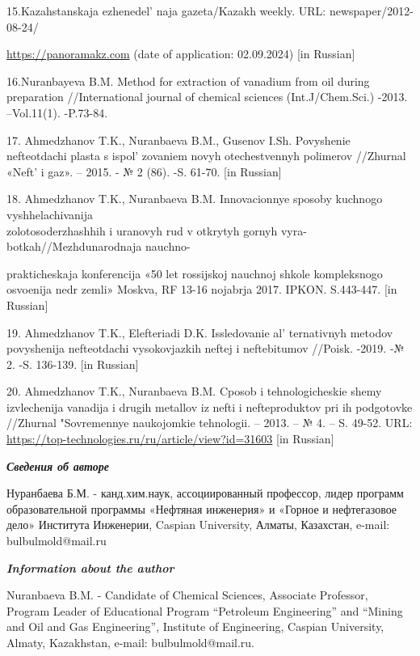 \begin{references}
15.Kazahstanskaja ezhenedel' naja gazeta/Kazakh weekly.
URL: newspaper/2012-08-24/

\href{https://panoramakz.com/index.php/economics/oil/item/32263-?utm\_source=google.com\&utm\_medium=organic\&utm\_campaign=google.com\&utm\_referrer=google.com}{https://panoramakz.com}
(date of application: 02.09.2024) {[}in Russian{]}

16.Nuranbayeva B.M. Method for extraction of vanadium from oil during
preparation //International journal of chemical sciences
(Int.J/Chem.Sci.) -2013. --Vol.11(1). -P.73-84.

17. Ahmedzhanov T.K., Nuranbaeva B.M., Gusenov I.Sh. Povyshenie
nefteotdachi plasta s ispol' zovaniem novyh
otechestvennyh polimerov //Zhurnal «Neft'{} i gaz». --
2015. - № 2 (86). -S. 61-70. {[}in Russian{]}

18. Ahmedzhanov T.K., Nuranbaeva B.M. Innovacionnye sposoby kuchnogo
vyshhelachivanija \\zolotosoderzhashhih i uranovyh rud v otkrytyh gornyh
vyra-botkah//Mezhdunarodnaja nauchno-

prakticheskaja konferencija «50 let
rossijskoj nauchnoj shkole kompleksnogo osvoenija nedr zemli» Moskva, RF
13-16 nojabrja 2017. IPKON. S.443-447. {[}in Russian{]}

19. Ahmedzhanov T.K., Elefteriadi D.K. Issledovanie
al' ternativnyh metodov povyshenija nefteotdachi
vysokovjazkih neftej i neftebitumov //Poisk. -2019. -№ 2. -S. 136-139.
{[}in Russian{]}

20. Ahmedzhanov T.K., Nuranbaeva B.M. Cposob i tehnologicheskie shemy
izvlechenija vanadija i drugih metallov iz nefti i nefteproduktov pri ih
podgotovke //Zhurnal "Sovremennye naukojomkie tehnologii. -- 2013. -- №
4. -- S. 49-52. URL:
\url{https://top-technologies.ru/ru/article/view?id=31603} {[}in
Russian{]}
\end{references}


\begin{authorinfo}
  \hspace{1em}\emph{{\bfseries Сведения об авторе}}

Нуранбаева Б.М. - канд.хим.наук, ассоциированный профессор, лидер
программ образовательной программы «Нефтяная инженерия» и «Горное и
нефтегазовое дело» Института Инженерии, Caspian University, Алматы,
Казахстан, e-mail: bulbulmold@mail.ru

\hspace{1em}\emph{{\bfseries Information about the author}}

Nuranbaeva B.M. - Candidate of Chemical Sciences, Associate Professor, Program Leader of Educational Program
“Petroleum Engineering” and “Mining and Oil and Gas Engineering”, Institute of Engineering, Caspian University,
Almaty, Kazakhstan, e-mail: bulbulmold@mail.ru.
\end{authorinfo}

